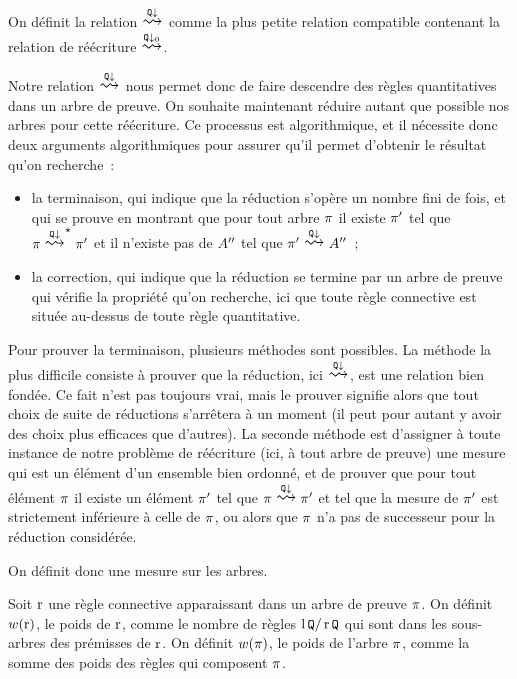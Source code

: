 \begin{definition}
  On définit la relation $\reecr{\quantif\downarrow}$ comme la plus petite
  relation compatible contenant la relation de réécriture
  $\reecr{\quantif\downarrow_0}$.
\end{definition}

Notre relation $\reecr{\quantif\downarrow}$ nous permet donc de faire descendre
des règles quantitatives dans un arbre de preuve. On souhaite maintenant réduire
autant que possible nos arbres pour cette réécriture. Ce processus est
algorithmique, et il nécessite donc deux arguments algorithmiques pour assurer
qu'il permet d'obtenir le résultat qu'on recherche~:
\begin{itemize}
\item la terminaison, qui indique que la réduction s'opère un nombre fini de
  fois, et qui se prouve en montrant que pour tout arbre $\pi$ il existe
  $\pi'$ tel que $\varPT\rtClot{\reecr{\quantif\downarrow}}\varPT'$
  et il n'existe pas de $A''$ tel que
  $\varPT'\reecr{\quantif\downarrow}\varPt''$~;
\item la correction, qui indique que la réduction se termine par un arbre de
  preuve qui vérifie la propriété qu'on recherche, ici que toute règle
  connective est située au-dessus de toute règle quantitative.
\end{itemize}

Pour prouver la terminaison, plusieurs méthodes sont possibles. La méthode la
plus difficile consiste à prouver que la réduction, ici
$\reecr{\quantif\downarrow}$, est une relation bien fondée. Ce fait n'est pas
toujours vrai, mais le prouver signifie alors que tout choix de suite de
réductions s'arrêtera à un moment (il peut pour autant y avoir des choix plus
efficaces que d'autres). La seconde méthode est d'assigner à toute instance de
notre problème de réécriture (ici, à tout arbre de preuve) une \og mesure\fg
qui est un élément d'un ensemble bien ordonné, et de prouver que pour tout
élément $\pi$ il existe un élément $\pi'$ tel que
$\varPT\reecr{\quantif\downarrow} \varPT'$ et tel que la mesure de $\pi'$
est strictement inférieure à celle de $\pi$, ou alors que $\pi$ n'a pas de
successeur pour la réduction considérée.

On définit donc une mesure sur les arbres.

\begin{definition}
  Soit $\operatorname{r}$ une règle connective apparaissant dans un arbre de preuve
  $\pi$.
  On définit $w(\operatorname{r})$, le poids de $\operatorname{r}$, comme le nombre de règles
  $\operatorname{l}{\mathord{{\normalfont\texttt{Q}}}}/\operatorname{r}{\mathord{{\normalfont\texttt{Q}}}}$ qui sont dans les sous-arbres des prémisses de $\operatorname{r}$.
  On définit $w(\pi)$, le poids de l'arbre $\pi$, comme la somme des
  poids des règles qui composent $\pi$.
\end{definition}

